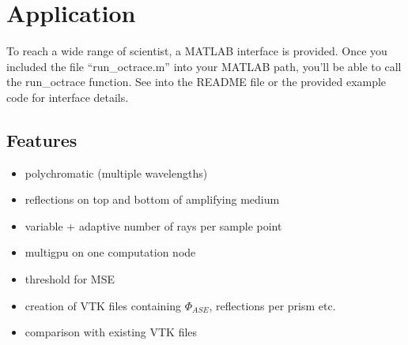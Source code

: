 \section{Application}
To reach a wide range of scientist, a MATLAB interface is provided. Once
you included the file ``run\_octrace.m'' into your MATLAB path, you'll be able
to call the run\_octrace function. See into the README file or the provided
example code for interface details.
\subsection{Features}
\begin{itemize}
  \item polychromatic (multiple wavelengths)
  \item reflections on top and bottom of amplifying medium
  \item variable + adaptive number of rays per sample point
  \item multigpu on one computation node
  \item threshold for MSE
  \item creation of VTK files containing $\Phi_{ASE}$, reflections per prism etc.
  \item comparison with existing VTK files 
\end{itemize}

